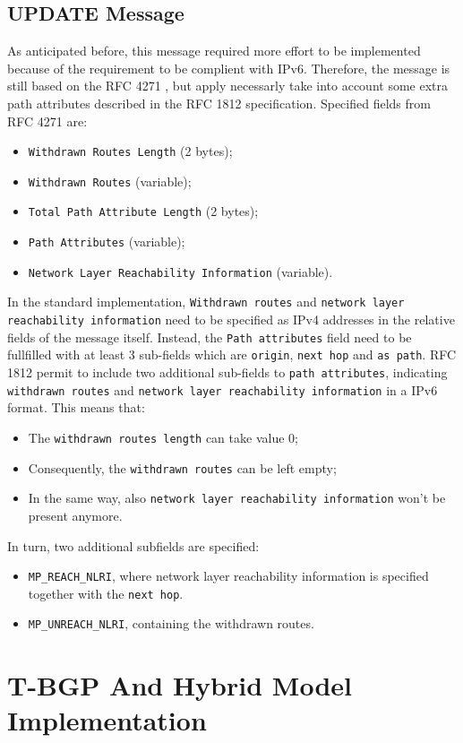 \subsection{UPDATE Message}
As anticipated before, this message required more effort to be implemented because of the requirement to be complient with IPv6.
Therefore, the message is still based on the RFC 4271 \cite{rfc4271}, but apply necessarly take into account some extra path attributes described in the RFC 1812 \cite{rfc1812} specification.
Specified fields from RFC 4271 are:
\begin{itemize}
    \item \texttt{Withdrawn Routes Length} (2 bytes);
    \item \texttt{Withdrawn Routes} (variable);
    \item \texttt{Total Path Attribute Length} (2 bytes);
    \item \texttt{Path Attributes} (variable);
    \item \texttt{Network Layer Reachability Information} (variable).
\end{itemize}
In the standard implementation, \texttt{Withdrawn routes} and \texttt{network layer reachability information} need to be specified as IPv4 addresses in the relative fields of the message itself. Instead, the \texttt{Path attributes} field need to be fullfilled with at least 3 sub-fields which are \texttt{origin}, \texttt{next hop} and \texttt{as path}.
RFC 1812 permit to include two additional sub-fields to \texttt{path attributes}, indicating \texttt{withdrawn routes} and \texttt{network layer reachability information} in a IPv6 format.
This means that:
\begin{itemize}
    \item The \texttt{withdrawn routes length} can take value 0;
    \item Consequently, the \texttt{withdrawn routes} can be left empty;
    \item In the same way, also \texttt{network layer reachability information} won't be present anymore.
\end{itemize}
In turn, two additional subfields are specified:
\begin{itemize}
    \item \texttt{MP\_REACH\_NLRI}, where network layer reachability information is specified together with the \texttt{next hop}.
    \item \texttt{MP\_UNREACH\_NLRI}, containing the withdrawn routes.
\end{itemize}

\section{T-BGP And Hybrid Model Implementation}\label{BGPTrust}
